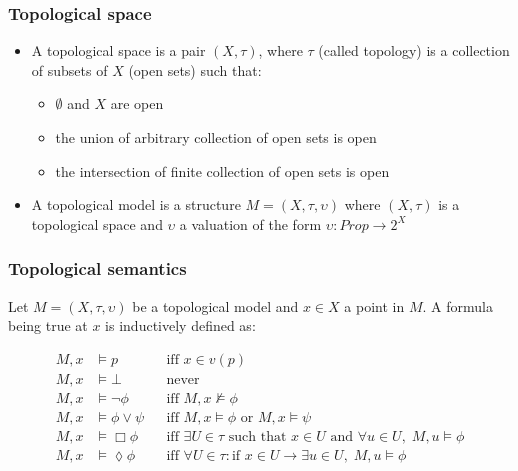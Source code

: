 \documentclass[hyperref={pdfpagelabels=false},t,10pt]{beamer}
\begin{document}
    \begin{frame}
      \frametitle{Topological space}
      \begin{itemize}
            \item A topological space is a pair $(X, \tau)$, where $\tau$ (called topology) is a collection of subsets of $X$ (open sets) such that: 
        \begin{itemize}
          \item $\emptyset$ and $X$ are open
          \item the union of arbitrary collection of open sets is open
          \item the intersection of finite collection of open sets is open
        \end{itemize}
          \item A topological model is a structure $M = (X,\tau, \upsilon)$ where $(X, \tau)$ is a topological space and $\upsilon$ a valuation of the form $\upsilon : Prop \rightarrow 2^X$ 
      \end{itemize}
  \end{frame}

\begin{frame}
  \frametitle{Topological semantics}
  Let $M = (X, \tau, \upsilon)$ be a topological model and $x \in X$ a point in $M$. A formula being true at $x$ is inductively defined as:

  \[
\begin{aligned}
    M, x &\vDash p &&\text{iff } x \in v(p) \\
    M, x &\vDash \bot &&\text{never} \\
    M, x &\vDash \neg \phi &&\text{iff } M, x \nvDash \phi \\
    M, x &\vDash \phi \lor \psi &&\text{iff } M, x \vDash \phi \text{ or } M, x \vDash \psi \\
    M, x &\vDash \Box \phi &&\text{iff }\exists U \in \tau \text{ such that } x \in U \text{ and } \forall u \in U,\; M, u \vDash \phi \\
    M, x &\vDash \lozenge \phi &&\text{iff }\forall U \in \tau: \text{if }x \in U \rightarrow \exists u \in U,\; M, u \vDash \phi
\end{aligned}
\]

\end{frame}
\end{document}
